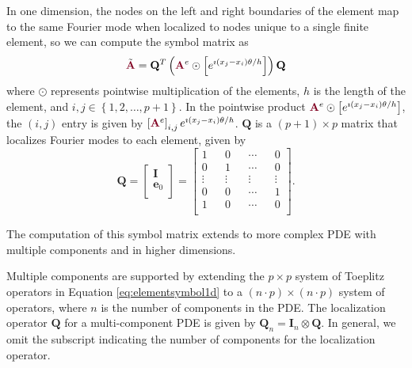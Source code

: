 In one dimension, the nodes on the left and right boundaries of the element map to the same Fourier mode when localized to nodes unique to a single finite element, so we can compute the symbol matrix as
\begin{equation}
\tilde{{\color{burgundy}\mathbf{A}}} = \mathbf{Q}^T \left( {\color{burgundy}\mathbf{A}}^e \odot \left[ e^{\imath \left( x_j - x_i \right) \theta / h} \right] \right) \mathbf{Q}
\label{eq:elementsymbol1d}
\end{equation}
where $\odot$ represents pointwise multiplication of the elements, $h$ is the length of the element, and $i, j \in \left\lbrace 1, 2, \dots, p + 1 \right\rbrace$.
In the pointwise product ${\color{burgundy}\mathbf{A}}^e \odot \left[ e^{\imath \left( x_j - x_i \right) \theta / h} \right]$, the $\left( i, j \right)$ entry is given by $\left[ {\color{burgundy}\mathbf{A}}^e \right]_{i, j} e^{\imath \left( x_j - x_i \right) \theta / h}$.
$\mathbf{Q}$ is a $\left( p + 1 \right) \times p$ matrix that localizes Fourier modes to each element, given by
\begin{equation}
\mathbf{Q} =
\begin{bmatrix}
    \mathbf{I}   \\
    \mathbf{e}_0 \\
\end{bmatrix} =
\begin{bmatrix}
    1      && 0      && \cdots && 0      \\
    0      && 1      && \cdots && 0      \\
    \vdots && \vdots && \vdots && \vdots \\
    0      && 0      && \cdots && 1      \\
    1      && 0      && \cdots && 0      \\
\end{bmatrix}.
\label{eq:fouriermodelocalization1d}
\end{equation}

The computation of this symbol matrix extends to more complex PDE with multiple components and in higher dimensions.

Multiple components are supported by extending the $p \times p$ system of Toeplitz operators in Equation \ref{eq:elementsymbol1d} to a $\left( n \cdot p \right) \times \left( n \cdot p \right)$ system of operators, where $n$ is the number of components in the PDE.
The localization operator $\mathbf{Q}$ for a multi-component PDE is given by $\mathbf{Q}_n = \mathbf{I}_n \otimes \mathbf{Q}$.
In general, we omit the subscript indicating the number of components for the localization operator.

